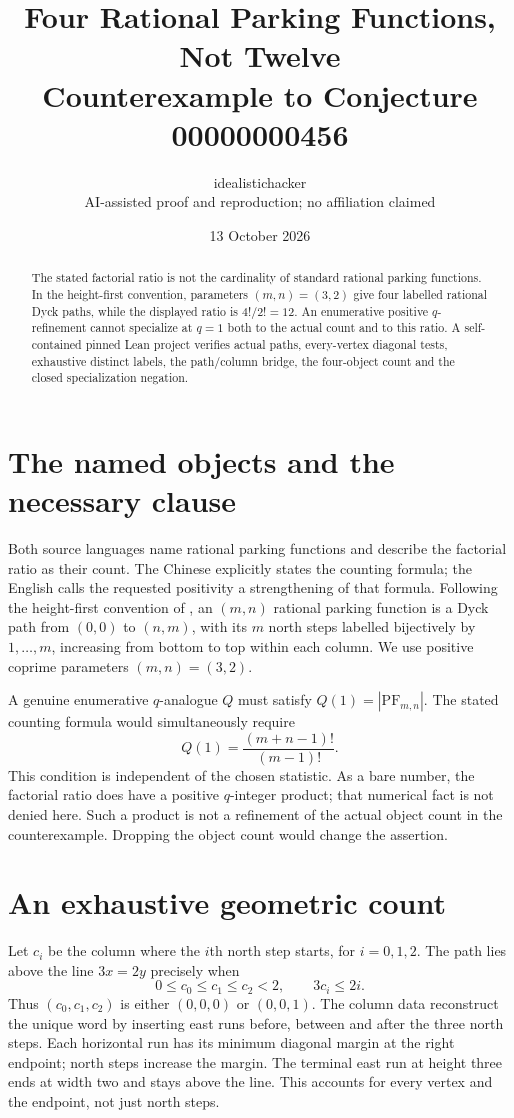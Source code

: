 \documentclass[10pt,a4paper]{article}
\title{Four Rational Parking Functions, Not Twelve\\Counterexample to Conjecture 00000000456}
\author{idealistichacker\\\small AI-assisted proof and reproduction; no affiliation claimed}
\date{13 October 2026}
\begin{document}
\maketitle
\begin{abstract}
The stated factorial ratio is not the cardinality of standard rational parking
functions. In the height-first convention, parameters $(m,n)=(3,2)$ give four
labelled rational Dyck paths, while the displayed ratio is $4!/2!=12$.
An enumerative positive $q$-refinement cannot specialize at $q=1$ both to the
actual count and to this ratio. A self-contained pinned Lean project verifies
actual paths, every-vertex diagonal tests, exhaustive distinct labels, the
path/column bridge, the four-object count and the closed specialization negation.
\end{abstract}

\section{The named objects and the necessary clause}
Both source languages name rational parking functions and describe the factorial
ratio as their count. The Chinese explicitly states the counting formula; the
English calls the requested positivity a strengthening of that formula.
Following the height-first convention of \cite{ALW}, an $(m,n)$ rational parking
function is a Dyck path from $(0,0)$ to $(n,m)$, with its $m$ north steps labelled
bijectively by $1,\ldots,m$, increasing from bottom to top within each column.
We use positive coprime parameters $(m,n)=(3,2)$.

A genuine enumerative $q$-analogue $Q$ must satisfy $Q(1)=|\mathrm{PF}_{m,n}|$.
The stated counting formula would simultaneously require
\[
 Q(1)=\frac{(m+n-1)!}{(m-1)!}.
\]
This condition is independent of the chosen statistic. As a bare number, the
factorial ratio does have a positive $q$-integer product; that numerical fact
is not denied here. Such a product is not a refinement of the actual object
count in the counterexample. Dropping the object count would change the assertion.

\section{An exhaustive geometric count}
Let $c_i$ be the column where the $i$th north step starts, for $i=0,1,2$.
The path lies above the line $3x=2y$ precisely when
\[
 0\leq c_0\leq c_1\leq c_2<2,\qquad 3c_i\leq2i.
\]
Thus $(c_0,c_1,c_2)$ is either $(0,0,0)$ or $(0,0,1)$.
The column data reconstruct the unique word by inserting east runs before,
between and after the three north steps. Each horizontal run has its minimum
diagonal margin at the right endpoint; north steps increase the margin.
The terminal east run at height three ends at width two and stays above the
line. This accounts for every vertex and the endpoint, not just north steps.
\end{document}
